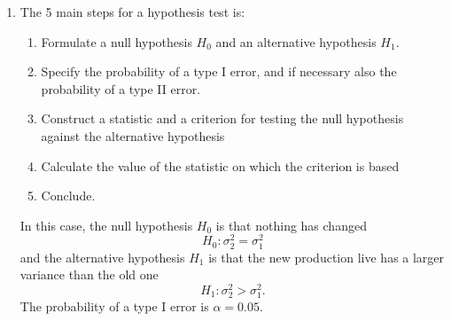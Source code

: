 \begin{derivation}
\begin{enumerate}[label=\alph*)]
        The 95\% confidence interval in terms of the observed sample variances $s_1^2$ and $s_2^2$ is given by
        \begin{equation*}
          F_{1 - \alpha / 2} \frac{s_2^2}{s_1^2} < \frac{\sigma_2^2}{\sigma_1^2} < F_{\alpha / 2}\frac{s_2^2}{s_1^2}
        .\end{equation*}
        with $\alpha = \num{0,05}$.
        We use Matlab to find the values of $F_{1-\alpha / 2}$ and $F_{\alpha / 2}$ for $n_1 - 1 = n_2 - 1 = 39$ degrees of freedom as $F_{\num{0,975}, 39, 39} = \num{0,5289}$ and $F_{\num{0,025}, 39, 39} = \num{1,8907}$.
        Hence using Matlab, the 95\% confidence interval for the variance ratio is
        \begin{equation*}
          \text{CI}_{\sigma, 95\%} = [\num{0,2320}; \num{0,8295}]
        .\end{equation*}
        
       \item The 5 main steps for a hypothesis test is:
         \begin{enumerate}
          \item Formulate a null hypothesis $H_0$ and an alternative hypothesis $H_1$.
          \item Specify the probability of a type I error, and if necessary also the probability of a type II error.
          \item Construct a statistic and a criterion for testing the null hypothesis against the alternative hypothesis
          \item Calculate the value of the statistic on which the criterion is based
          \item Conclude.
         \end{enumerate}
         In this case, the null hypothesis $H_0$ is that nothing has changed
         \begin{equation*}
           H_0 : \sigma_2^2 = \sigma_1^2
         \end{equation*}
         and the alternative hypothesis $H_1$ is that the new production live has a larger variance than the old one
         \begin{equation*}
           H_1 : \sigma_{2}^2 > \sigma_1^2
         .\end{equation*}
         The probability of a type I error is $\alpha = \num{0,05}$.


\end{enumerate}
\end{derivation}
